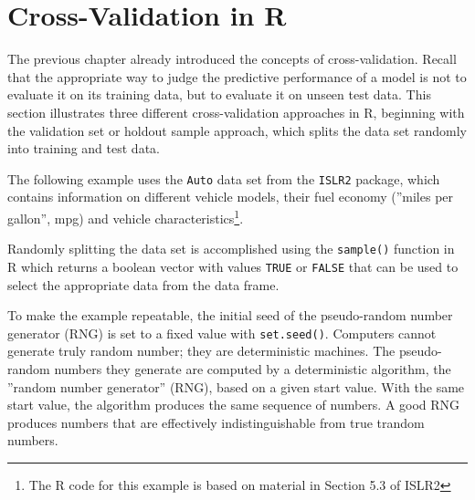 \section{Cross-Validation in R}

The previous chapter already introduced the concepts of cross-validation. Recall that the appropriate way to judge the predictive performance of a model is not to evaluate it on its training data, but to evaluate it on unseen test data. This section illustrates three different cross-validation approaches in R, beginning with the validation set or holdout sample approach, which splits the data set randomly into training and test data. 

The following example uses the \texttt{Auto} data set from the \texttt{ISLR2} package, which contains information on different vehicle models, their fuel economy (''miles per gallon'', mpg) and vehicle characteristics\footnote{The R code for this example is based on material in Section 5.3 of ISLR2}.

Randomly splitting the data set is accomplished using the \texttt{sample()} function in R which returns a boolean vector with values \texttt{TRUE} or \texttt{FALSE} that can be used to select the appropriate data from the data frame. 

To make the example repeatable, the initial seed of the pseudo-random number generator (RNG) is set to a fixed value with \texttt{set.seed()}. Computers cannot generate truly random number; they are deterministic machines. The pseudo-random numbers they generate are computed by a deterministic algorithm, the ''random number generator'' (RNG), based on a given start value. With the same start value, the algorithm produces the same sequence of numbers. A good RNG produces numbers that are effectively indistinguishable from true trandom numbers.

\begin{samepage}
\end{samepage}

